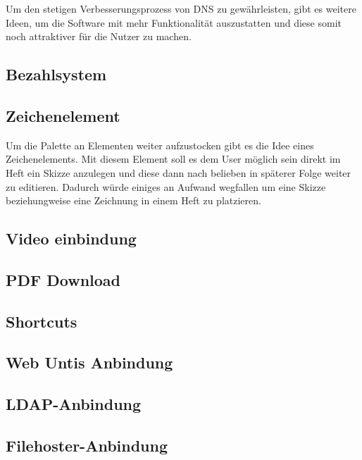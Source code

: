 Um den stetigen Verbesserungsprozess von DNS zu gewährleisten, gibt es weitere Ideen, um die Software mit mehr Funktionalität auszustatten und diese somit noch attraktiver für die Nutzer zu machen. 
\subsection{Bezahlsystem}
\subsection{Zeichenelement}
Um die Palette an Elementen weiter aufzustocken gibt es die Idee eines Zeichenelements. Mit diesem Element soll es dem User möglich sein direkt im Heft ein Skizze anzulegen und diese dann nach belieben in späterer Folge weiter zu editieren. Dadurch würde einiges an Aufwand wegfallen um eine Skizze beziehungweise eine Zeichnung in einem Heft zu platzieren.
\subsection{Video einbindung}
\subsection{PDF Download}
\subsection{Shortcuts}
\subsection{Web Untis Anbindung}
\subsection{LDAP-Anbindung}
\subsection{Filehoster-Anbindung }

